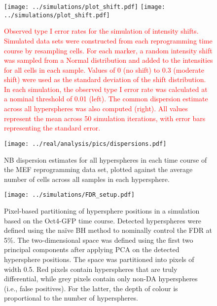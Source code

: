 \documentclass{article}
\newcommand\revised[1]{\textcolor{red}{#1}}
\begin{document}
\begin{figure}[tbp]
    \begin{center}
        \texttt{[image: ../simulations/plot\_shift.pdf]}
        \texttt{[image: ../simulations/plot\_shift.pdf]}
    \end{center}
    \caption{\revised{Observed type I error rates for the simulation of intensity shifts.
        Simulated data sets were constructed from each reprogramming time course by resampling cells.
        For each marker, a random intensity shift was sampled from a Normal distribution and added to the intensities for all cells in each sample.
        Values of 0 (no shift) to 0.3 (moderate shift) were used as the standard deviation of the shift distribution.
        In each simulation, the observed type I error rate was calculated at a nominal threshold of 0.01 (left).
        The common dispersion estimate across all hyperspheres was also computed (right).
        All values represent the mean across 50 simulation iterations, with error bars representing the standard error.
    }
}
\label{fig:shift_sim}
\end{figure}

\begin{figure}[p]
    \begin{center}
    \texttt{[image: ../real/analysis/pics/dispersions.pdf]}
    \end{center}
    \caption{NB dispersion estimates for all hyperspheres in each time course of the MEF reprogramming data set, plotted against the average number of cells across all samples in each hypersphere.}
\end{figure}

\begin{figure}[p]
    \begin{center}
        \texttt{[image: ../simulations/FDR\_setup.pdf]}
    \end{center}
    \caption{Pixel-based partitioning of hypersphere positions in a simulation based on the Oct4-GFP time course.
        Detected hyperspheres were defined using the na\"ive BH method to nominally control the FDR at 5\%.
        The two-dimensional space was defined using the first two principal components after applying PCA on the detected hypersphere positions.
        The space was partitioned into pixels of width 0.5.
        Red pixels contain hyperspheres that are truly differential, while grey pixels contain only non-DA hyperspheres (i.e., false positives).
        For the latter, the depth of colour is proportional to the number of hyperspheres.
    }
\end{figure}
\end{document}
